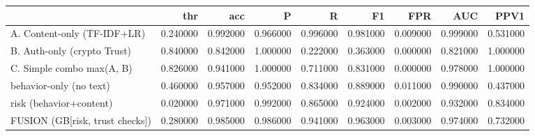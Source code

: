 \begin{tabular}{lrrrrrrrr}
\toprule
 & thr & acc & P & R & F1 & FPR & AUC & PPV1 \\
\midrule
A. Content-only (TF-IDF+LR) & 0.240000 & 0.992000 & 0.966000 & 0.996000 & 0.981000 & 0.009000 & 0.999000 & 0.531000 \\
B. Auth-only (crypto Trust) & 0.840000 & 0.842000 & 1.000000 & 0.222000 & 0.363000 & 0.000000 & 0.821000 & 1.000000 \\
C. Simple combo max(A, B) & 0.826000 & 0.941000 & 1.000000 & 0.711000 & 0.831000 & 0.000000 & 0.978000 & 1.000000 \\
behavior-only (no text) & 0.460000 & 0.957000 & 0.952000 & 0.834000 & 0.889000 & 0.011000 & 0.990000 & 0.437000 \\
risk (behavior+content) & 0.020000 & 0.971000 & 0.992000 & 0.865000 & 0.924000 & 0.002000 & 0.932000 & 0.834000 \\
FUSION (GB[risk, trust checks]) & 0.280000 & 0.985000 & 0.986000 & 0.941000 & 0.963000 & 0.003000 & 0.974000 & 0.732000 \\
\bottomrule
\end{tabular}
